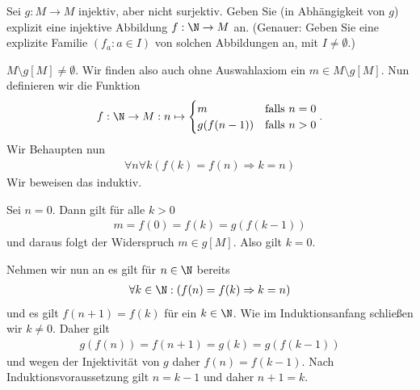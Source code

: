 
\begin{exercise}[270]

Sei $g: M \to M$ injektiv, aber nicht surjektiv. Geben Sie (in Abhängigkeit von $g$)
explizit eine injektive Abbildung $f: \N \to M$ an.
(Genauer: Geben Sie eine explizite Familie $(f_a: a \in I)$ von solchen Abbildungen
an, mit $I \neq \emptyset$.)

\end{exercise}


\begin{solution}

$M \setminus g[M] \neq \emptyset$. Wir finden also auch ohne Auswahlaxiom ein $m \in M \setminus g[M]$. Nun definieren wir die Funktion
\begin{align*}
	f: \N \to M: n \mapsto
	\begin{cases}
		m & \text{falls } n = 0 \\
		g(f(n - 1)) & \text{falls } n > 0 
	\end{cases}.
\end{align*}
Wir Behaupten nun
\begin{align*}
	\forall n \forall k (f(k) = f(n) \Rightarrow k = n)
\end{align*}
Wir beweisen das induktiv.

Sei $n = 0$. Dann gilt für alle $k > 0$
\begin{align*}
	m = f(0) = f(k) = g(f(k - 1))
\end{align*}
und daraus folgt der Widerspruch $m \in g[M]$. Also gilt $k = 0$. 

Nehmen wir nun an es gilt für $n \in \N$ bereits 
\begin{align*}
	\forall k \in \N: (f(n) = f(k) \Rightarrow k = n)
\end{align*}
und es gilt $f(n + 1) = f(k)$ für ein $k \in \N$. Wie im Induktionsanfang schließen wir $k \neq 0$. Daher gilt
\begin{align*}
	g(f(n)) = f(n + 1) = g(k) = g(f(k - 1))
\end{align*}
und wegen der Injektivität von $g$ daher $f(n) = f(k - 1)$. Nach Induktionsvoraussetzung gilt $n = k - 1$ und daher $n + 1 = k$. 

\end{solution}
